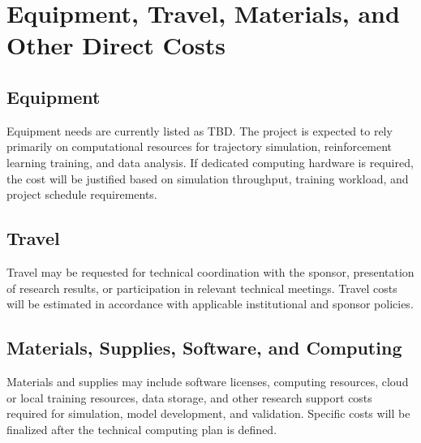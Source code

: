 \section{Equipment, Travel, Materials, and Other Direct Costs}

\subsection{Equipment}

Equipment needs are currently listed as TBD. The project is expected to rely primarily on computational resources for trajectory simulation, reinforcement learning training, and data analysis. If dedicated computing hardware is required, the cost will be justified based on simulation throughput, training workload, and project schedule requirements.

\subsection{Travel}

Travel may be requested for technical coordination with the sponsor, presentation of research results, or participation in relevant technical meetings. Travel costs will be estimated in accordance with applicable institutional and sponsor policies.

\subsection{Materials, Supplies, Software, and Computing}

Materials and supplies may include software licenses, computing resources, cloud or local training resources, data storage, and other research support costs required for simulation, model development, and validation. Specific costs will be finalized after the technical computing plan is defined.
